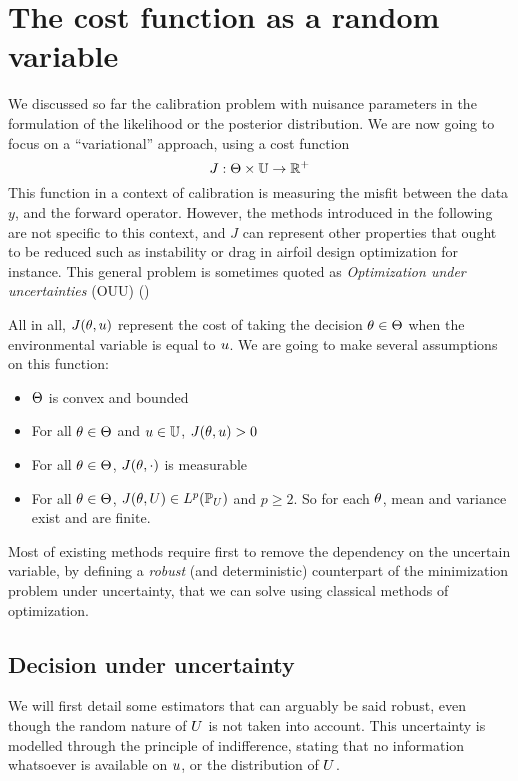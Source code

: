 \documentclass[../../Main_ManuscritThese.tex]{subfiles}
\begin{document}
\section{The cost function as a random variable}
\label{sec:J_rv}
We discussed so far the calibration problem with nuisance parameters in the formulation of the likelihood or the posterior distribution. We are now going to focus on a ``variational'' approach, using a cost function
\begin{equation}
  J: \Theta \times \mathbb{U} \rightarrow \mathbb{R}^+
\end{equation} 
This function in a context of calibration is measuring the misfit between the data $y$, and the forward operator. However, the methods introduced in the following are not specific to this context, and $J$ can represent other properties that ought to be reduced such as instability or drag in airfoil design optimization for instance. This general problem is sometimes quoted as \emph{Optimization under uncertainties} (OUU) (\cite{cook_effective_2018,seshadri_density-matching_2014})


All in all, $J(\theta, u)$ represent the cost of taking the decision $\theta\in\Theta$ when the environmental variable is equal to $u$.
We are going to make several assumptions on this function:
\begin{itemize}
\item $\Theta$ is convex and bounded 
\item For all $\theta \in \Theta$ and $u \in \mathbb{U}$, $J(\theta, u)>0$
\item For all $\theta \in \Theta$, $J(\theta, \cdot)$ is measurable
\item For all $\theta \in \Theta$, $J(\theta, U) \in L^p(\mathbb{P}_{U})$ and $p \geq 2$. So for each $\theta$, mean and variance exist and are finite.
\end{itemize}

Most of existing methods require first to remove the dependency on the uncertain variable, by defining a \emph{robust} (and deterministic) counterpart of the minimization problem under uncertainty, that we can solve using classical methods of optimization.

\subsection{Decision under uncertainty}
We will first detail some estimators that can arguably be said robust, even though the random nature of $U$ is not taken into account. This uncertainty is modelled through the principle of indifference, stating that no information whatsoever is available on $u$, or the distribution of $U$.
\end{document}
